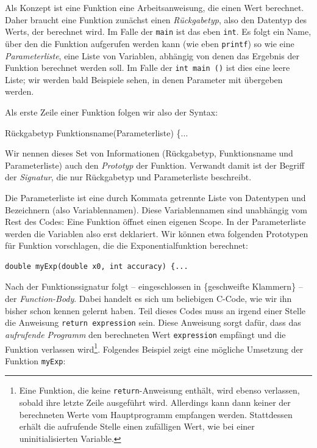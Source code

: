 Als Konzept ist eine Funktion eine Arbeitsanweisung, die einen Wert berechnet. Daher braucht eine Funktion zunächst einen \emph{Rückgabetyp}, also den Datentyp des Werts, der berechnet wird. Im Falle der \texttt{main} ist das eben \texttt{int}. Es folgt ein Name, über den die Funktion aufgerufen werden kann (wie eben \texttt{printf}) so wie eine \emph{Parameterliste}, \ie eine Liste von Variablen, abhängig von denen das Ergebnis der Funktion berechnet werden soll. Im Falle der \texttt{int main ()} ist dies eine leere Liste; wir werden bald Beispiele sehen, in denen Parameter mit übergeben werden.

Als erste Zeile einer Funktion folgen wir also der Syntax:
\begin{codebox}
Rückgabetyp Funktionsname(Parameterliste) \{...
\end{codebox}
Wir nennen dieses Set von Informationen (Rückgabetyp, Funktionsname und Parameterliste) auch den \emph{Prototyp} der Funktion. Verwandt damit ist der Begriff der \emph{Signatur}, die nur Rückgabetyp und Parameterliste beschreibt.

Die Parameterliste ist eine durch Kommata getrennte Liste von Datentypen und Bezeichnern (also Variablennamen). Diese Variablennamen sind unabhängig vom Rest des Codes: Eine Funktion öffnet einen eigenen Scope. In der Parameterliste werden die Variablen also erst deklariert. Wir können etwa folgenden Prototypen für Funktion vorschlagen, die die Exponentialfunktion berechnet:

\begin{codebox}
\begin{verbatim}
double myExp(double x0, int accuracy) {...
\end{verbatim}
\end{codebox}

Nach der Funktionssignatur folgt -- eingeschlossen in \{geschweifte Klammern\} -- der \emph{Function-Body}. Dabei handelt es sich um beliebigen C-Code, wie wir ihn bisher schon kennen gelernt haben. Teil dieses Codes muss an irgend einer Stelle die Anweisung \texttt{return expression} sein. Diese Anweisung sorgt dafür, dass das \emph{aufrufende Programm} den berechneten Wert \texttt{expression} empfängt und die Funktion verlassen wird\footnote{Eine Funktion, die keine \texttt{return}-Anweisung enthält, wird ebenso verlassen, sobald ihre letzte Zeile ausgeführt wird. Allerdings kann dann keiner der berechneten Werte vom Hauptprogramm empfangen werden. Stattdessen erhält die aufrufende Stelle einen zufälligen Wert, wie bei einer uninitialisierten Variable.}. Folgendes Beispiel zeigt eine mögliche Umsetzung der Funktion \texttt{myExp}:

